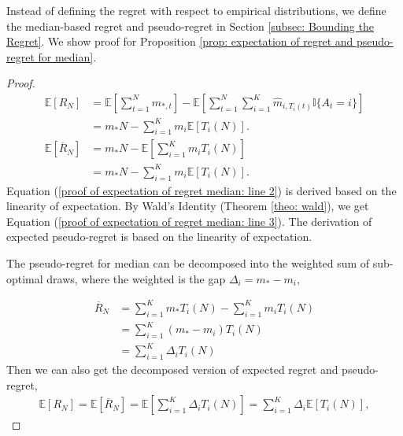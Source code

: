 Instead of defining the regret with respect to empirical distributions, we define the median-based regret and pseudo-regret in Section \ref{subsec: Bounding the Regret}. We show proof for Proposition \ref{prop: expectation of regret and pseudo-regret for median}. 

\EquMedianRegret*

\begin{proof}
\begingroup
\allowdisplaybreaks
\begin{align}
    \mathbb{E}[R_N] 
\label{proof of expectation of regret median: line 2}
    &= \mathbb{E}\left[\sum_{t=1}^{N} \hat{m}_{\ast, t}\right]- \mathbb{E}\left[\sum_{t=1}^{N} \sum_{i = 1}^{K} \hat{m}_{i, T_i(t)} \mathbb{I}\{A_t = i\}\right] \\
\label{proof of expectation of regret median: line 3}
    &= m_\ast N - \sum_{i = 1}^{K} m_i \mathbb{E}[T_i(N)].\\
    \mathbb{E}[\overline{R}_N]
    &= m_\ast N - \mathbb{E}\left[\sum_{i = 1}^{K} m_i T_i(N)\right] \\
    &= m_\ast N - \sum_{i = 1}^{K} m_i \mathbb{E}\left[T_i(N)\right].
\end{align}
Equation (\ref{proof of expectation of regret median: line 2}) is derived based on the linearity of expectation. By Wald's Identity (Theorem \ref{theo: wald}), we get Equation (\ref{proof of expectation of regret median: line 3}). The derivation of expected pseudo-regret is based on the linearity of expectation.

The pseudo-regret for median can be decomposed into the weighted sum of sub-optimal draws, where the weighted is the gap $\Delta_i = m_\ast - m_i$,

\begin{align}
    \overline{R}_N &= \sum_{i=1}^K m_\ast T_i(N) - \sum_{i = 1}^{K} m_i T_i(N) \\
    &= \sum_{i=1}^K (m_\ast - m_i) T_i(N)\\
    &= \sum_{i=1}^K \Delta_i T_i(N)
\end{align}
\endgroup
Then we can also get the decomposed version of expected regret and pseudo-regret,
\begin{align}
\mathbb{E}[R_N] = \mathbb{E}[\overline{R}_N] = \mathbb{E}\left[\sum_{i=1}^K \Delta_i T_i(N)\right] = \sum_{i=1}^K \Delta_i \mathbb{E}[T_i(N)],
\end{align}
\end{proof}


